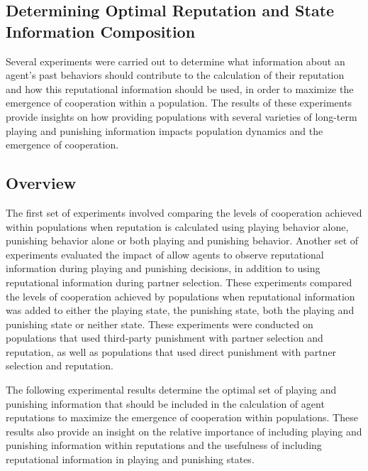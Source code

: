 \documentclass[sn-aps,numbered]{sn-jnl}%
\theoremstyle{thmstyleone}%
\theoremstyle{thmstyletwo}%
\theoremstyle{thmstylethree}%
\begin{document}
\begin{appendices}
\clearpage
\section{Determining Optimal Reputation and State Information Composition} \label{optimal_rep_state}

Several experiments were carried out to determine what information about an agent's past behaviors should contribute to the calculation of their reputation and how this reputational information should be used, in order to maximize the emergence of cooperation within a population. The results of these experiments provide insights on how providing populations with several varieties of long-term playing and punishing information impacts population dynamics and the emergence of cooperation. 

\subsection{Overview}

The first set of experiments involved comparing the levels of cooperation achieved within populations when reputation is calculated using playing behavior alone, punishing behavior alone or both playing and punishing behavior. Another set of experiments evaluated the impact of allow agents to observe reputational information during playing and punishing decisions, in addition to using reputational information during partner selection. These experiments compared the levels of cooperation achieved by populations when reputational information was added to either the playing state, the punishing state, both the playing and punishing state or neither state. These experiments were conducted on populations that used third-party punishment with partner selection and reputation, as well as populations that used direct punishment with partner selection and reputation.


The following experimental results determine the optimal set of playing and punishing information that should be included in the calculation of agent reputations to maximize the emergence of cooperation within populations. These results also provide an insight on the relative importance of including playing and punishing information within reputations and the usefulness of including reputational information in playing and punishing states. 


\end{appendices}
\end{document}
